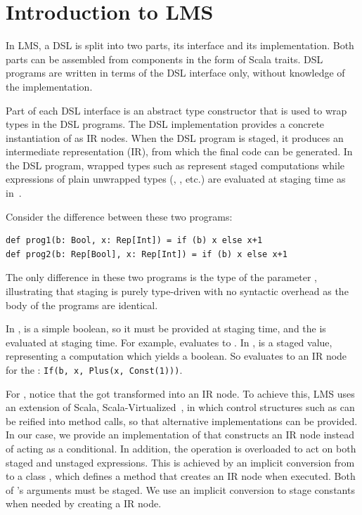 \documentclass[runningheads,a4paper]{llncs}
\begin{document}
\section{Introduction to LMS}

In LMS, a DSL is split into two parts, its
interface and its implementation. Both parts can be assembled from
components in the form of Scala traits. DSL programs are written in
terms of the DSL interface only, without knowledge of the
implementation.

Part of each DSL interface is an abstract type constructor
 that is used to wrap types in the DSL programs. The DSL
implementation provides a concrete instantiation of  as IR
nodes. When the DSL program is staged, it produces an intermediate
representation (IR), from which the final code can be generated. In
the DSL program, wrapped types such as  represent
staged computations while expressions of plain unwrapped types
(, , etc.) are evaluated at staging time as
in~\cite{finally-tagless,polymorphic-embedding}.

Consider the difference between these two programs:
\begin{lstlisting}
def prog1(b: Bool, x: Rep[Int]) = if (b) x else x+1
def prog2(b: Rep[Bool], x: Rep[Int]) = if (b) x else x+1
\end{lstlisting}

The only difference in these two programs is the type of the parameter
, illustrating that staging is purely type-driven with no
syntactic overhead as the body of the programs are identical.

In ,  is a simple boolean, so it must be provided
at staging time, and the  is evaluated at staging time. For
example,  evaluates to . In ,
 is a staged value, representing a computation which yields a
boolean. So  evaluates to an IR node for the :
{\tt\small If(b, x, Plus(x, Const(1)))}.

For , notice that the  got transformed into an IR
node. To achieve this, LMS uses an extension of Scala,
Scala-Virtualized~\cite{scala-virtualized}, in which control
structures such as  can be reified into method calls, so that
alternative implementations can be provided. In our case, we provide an
implementation of  that constructs an IR node instead of
acting as a conditional. In addition, the \code{+} operation is
overloaded to act on both staged and unstaged expressions. This is
achieved by an implicit conversion from  to a class
, which defines a \code{+} method that creates an IR node
 when executed. Both of 's arguments must be
staged. We use an implicit conversion to stage constants when needed
by creating a  IR node.
\end{document}
